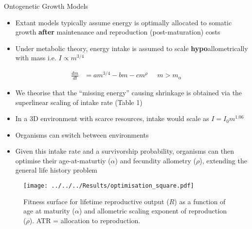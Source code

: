 \documentclass[xcolor={table}]{beamer}
\begin{document}
\begin{frame}[fragile=singleslide,t]
\begin{columns}[onlytextwidth,T]
\begin{column}{.47\textwidth}

\begin{block}{Ontogenetic Growth Models}
    \begin{itemize}
        \item Extant models typically assume energy is optimally allocated to somatic growth \textbf{after} maintenance and reproduction (post-maturation) costs
        \item Under metabolic theory, energy intake is assumed to scale \textbf{hypo}allometrically with mass i.e. $I \propto m^{3/4}$ \autocite{West2001}
    \end{itemize}
    \begin{align*}
        \frac{dm}{dt} &= am^{3/4} - bm - cm^{\rho} \; \; \; \;\; m > m_{\alpha}
    \end{align*}
    \begin{itemize}[noitemsep]
        \item We theorise that the ``missing energy'' causing shrinkage is obtained via the superlinear scaling of intake rate (Table 1)
        \item In a 3D environment with scarce resources, intake would scale as $I = I_{0}m^{1.06}$
        \item Organisms can switch between environments 
        \item Given this intake rate and a survivorship probability, organisms can then optimise their age-at-maturtiy ($\alpha$) and fecundity allometry ($\rho$), extending the general life history problem
    \end{itemize}
\begin{figure}
    \vspace*{-1.4cm} %
    \texttt{[image: ../../../Results/optimisation\_square.pdf]}
    \caption{Fitness surface for lifetime reproductive output ($R$) as a function of age at maturity ($\alpha$) and allometric scaling exponent of reproduction ($\rho$). ATR = allocation to reproduction.}
\end{figure}
\end{block}
\let\mkbibnamefamily\textsc\printbibliography

\end{column}
\end{columns}


\end{frame}
\end{document}

